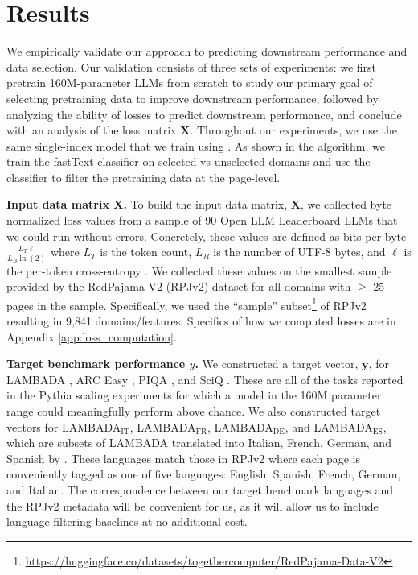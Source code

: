\documentclass{article} %
\begin{document}
\section{Results}

We empirically validate our approach to predicting downstream performance and data selection. Our validation consists of three sets of experiments: we first pretrain 160M-parameter LLMs from scratch to study our primary goal of selecting pretraining data to improve downstream performance, followed by analyzing the ability of losses to predict downstream performance, and conclude with an analysis of the loss matrix $\mathbf{X}$. Throughout our experiments, we use the same single-index model that we train using . As shown in the algorithm, we train the fastText classifier on selected vs unselected domains and use the classifier to filter the pretraining data at the page-level.

\textbf{Input data matrix X.} To build the input data matrix, $\mathbf{X}$, we collected byte normalized loss values from a sample of 90 Open LLM Leaderboard \citep{openllmleaderboard} LLMs that we could run without errors. Concretely, these values are defined as bits-per-byte $\frac{L_T\ell}{L_B\ln(2)}$ where $L_T$ is the token count, $L_B$ is the number of UTF-8 bytes, and $\ell$ is the per-token cross-entropy \citep{pile}. We collected these values on the smallest sample provided by the RedPajama V2 (RPJv2) dataset \citep{redpajama} for all domains with $\geq$ 25 pages in the sample. Specifically, we used the ``sample'' subset\footnote{\url{https://huggingface.co/datasets/togethercomputer/RedPajama-Data-V2}} of RPJv2 resulting in 9,841 domains/features. Specifics of how we computed losses are in Appendix \ref{app:loss_computation}.

\textbf{Target benchmark performance $y$.}
We constructed a target vector, $\mathbf{y}$, for LAMBADA \citep{paperno2016lambada}, ARC Easy \citep{arc}, PIQA \citep{piqa}, and SciQ \citep{sciq}. These are all of the tasks reported in the Pythia scaling experiments for which a model in the 160M parameter range could meaningfully perform above chance. We also constructed target vectors for LAMBADA$_{\text{IT}}$, LAMBADA$_{\text{FR}}$, LAMBADA$_{\text{DE}}$, and LAMBADA$_{\text{ES}}$, which are subsets of LAMBADA translated into Italian, French, German, and Spanish by \citet{black2023}. These languages match those in RPJv2 where each page is conveniently tagged as one of five languages: English, Spanish, French, German, and Italian. The correspondence between our target benchmark languages and the RPJv2 metadata will be convenient for us, as it will allow us to include language filtering baselines at no additional cost.
\end{document}
